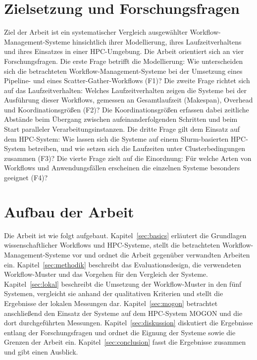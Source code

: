 \section{Zielsetzung und Forschungsfragen}
\label{sec:intro:goal}
\begin{sloppypar}
Ziel der Arbeit ist ein systematischer Vergleich ausgewählter
Workflow-Management-Systeme hinsichtlich ihrer Modellierung,
ihres Laufzeitverhaltens und ihres Einsatzes in einer
HPC-Umgebung. Die Arbeit orientiert sich an vier
Forschungsfragen. Die erste Frage betrifft die Modellierung:
Wie unterscheiden sich die betrachteten
Workflow-Management-Systeme bei der Umsetzung eines Pipeline- und
eines Scatter-Gather-Workflows (F1)? Die zweite Frage richtet sich
auf das Laufzeitverhalten: Welches Laufzeitverhalten zeigen die Systeme
bei der Ausführung dieser Workflows, gemessen an Gesamtlaufzeit (Makespan), Overhead und Koordinationsgrößen (F2)? Die Koordinationsgrößen erfassen dabei
zeitliche Abstände beim Übergang zwischen aufeinanderfolgenden
Schritten und beim Start paralleler Verarbeitungsinstanzen. Die
dritte Frage gilt dem Einsatz auf dem HPC-System: Wie lassen sich
die Systeme auf einem Slurm-basierten HPC-System betreiben, und
wie setzen sich die Laufzeiten unter Clusterbedingungen zusammen
(F3)? Die vierte Frage zielt auf die Einordnung: Für welche Arten
von Workflows und Anwendungsfällen erscheinen die einzelnen
Systeme besonders geeignet (F4)?
\end{sloppypar}

\section{Aufbau der Arbeit}
\label{sec:intro:structure}
Die Arbeit ist wie folgt aufgebaut.
Kapitel~\ref{sec:basics} erläutert die Grundlagen wissenschaftlicher
Workflows und HPC-Systeme, stellt die betrachteten
Workflow-Management-Systeme vor und ordnet die Arbeit gegenüber
verwandten Arbeiten ein. Kapitel~\ref{sec:methodik} beschreibt das
Evaluationsdesign, die verwendeten Workflow-Muster und das Vorgehen
für den Vergleich der Systeme. Kapitel~\ref{sec:lokal} beschreibt die Umsetzung der Workflow-Muster in den fünf Systemen, vergleicht sie anhand der qualitativen Kriterien und stellt die Ergebnisse der lokalen Messungen dar.
Kapitel~\ref{sec:mogon} betrachtet anschließend den Einsatz der
Systeme auf dem HPC-System MOGON und die dort durchgeführten
Messungen. Kapitel~\ref{sec:diskussion} diskutiert die Ergebnisse
entlang der Forschungsfragen und ordnet die Eignung der Systeme
sowie die Grenzen der Arbeit ein. Kapitel~\ref{sec:conclusion}
fasst die Ergebnisse zusammen und gibt einen Ausblick.
